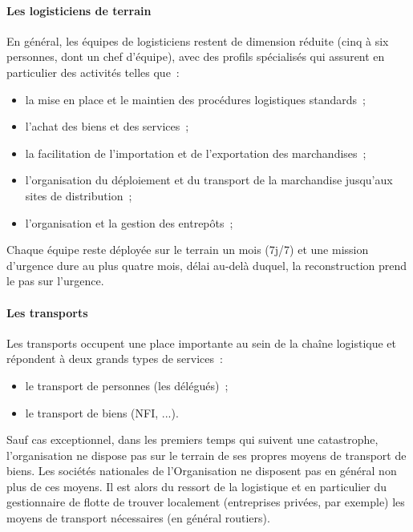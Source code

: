 
\paragraph{Les logisticiens de terrain}
En général, les équipes de logisticiens restent de dimension réduite (cinq à six personnes, dont un chef d'équipe), avec des profils spécialisés qui assurent en particulier des activités telles que~:
\begin{itemize}
	\item la mise en place et le maintien des procédures logistiques standards~;
	\item l'achat des biens et des services~;
	\item la facilitation de l'importation et de l'exportation des marchandises~;
	\item l'organisation du déploiement et du transport de la marchandise jusqu'aux sites de distribution~;
	\item l'organisation et la gestion des entrepôts~;
\end{itemize}
Chaque équipe reste déployée sur le terrain un mois (7j/7) et une mission d'urgence dure au plus quatre mois, délai au-delà duquel, la reconstruction prend le pas sur l'urgence.

\paragraph{Les transports}
Les transports occupent une place importante au sein de la chaîne logistique et répondent à deux grands types de services~:
\begin{itemize}
	\item le transport de personnes (les délégués)~;
	\item le transport de biens (NFI, ...).
\end{itemize}
Sauf cas exceptionnel, dans les premiers temps qui suivent une catastrophe, l'organisation ne dispose pas sur le terrain de ses propres moyens de transport de biens. Les sociétés nationales de l'Organisation ne disposent pas en général non plus de ces moyens. Il est alors du ressort de la logistique et en particulier du gestionnaire de flotte de trouver localement (entreprises privées, par exemple) les moyens de transport nécessaires (en général routiers).

